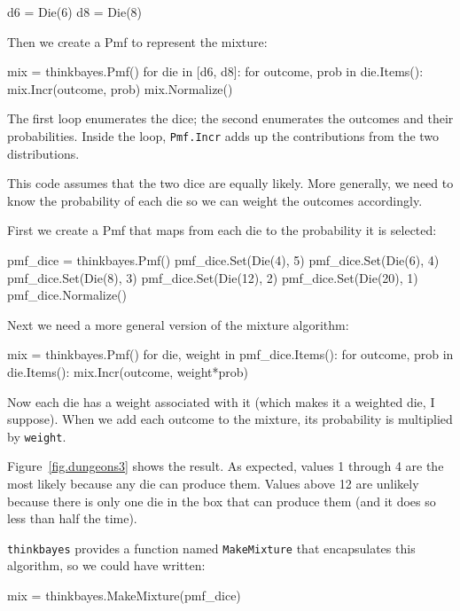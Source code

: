 \documentclass[12pt]{book}
\theoremstyle{exercise}
\begin{document}
\begin{code}
    d6 = Die(6)
    d8 = Die(8)
\end{code}

Then we create a Pmf to represent the mixture:

\begin{code}
    mix = thinkbayes.Pmf()
    for die in [d6, d8]:
        for outcome, prob in die.Items():
            mix.Incr(outcome, prob)
    mix.Normalize()
\end{code}

The first loop enumerates the dice; the second enumerates the
outcomes and their probabilities.  Inside the loop,
{\tt Pmf.Incr} adds up the contributions from the two distributions.

This code assumes that the two dice are equally likely.  More
generally, we need to know the probability of each die so we can
weight the outcomes accordingly.

First we create a Pmf that maps from each die to the probability it is
selected:

\begin{code}
    pmf_dice = thinkbayes.Pmf()
    pmf_dice.Set(Die(4), 5)
    pmf_dice.Set(Die(6), 4)
    pmf_dice.Set(Die(8), 3)
    pmf_dice.Set(Die(12), 2)
    pmf_dice.Set(Die(20), 1)
    pmf_dice.Normalize()
\end{code}

Next we need a more general version of the mixture algorithm:

\begin{code}
    mix = thinkbayes.Pmf()
    for die, weight in pmf_dice.Items():
        for outcome, prob in die.Items():
            mix.Incr(outcome, weight*prob)
\end{code}

Now each die has a weight associated with it (which makes it a
weighted die, I suppose).  When we add each outcome to the mixture,
its probability is multiplied by {\tt weight}.

Figure~\ref{fig.dungeons3} shows the result.  As expected, values 1
through 4 are the most likely because any die can produce them.
Values above 12 are unlikely because there is only one die in the box
that can produce them (and it does so less than half the time).

{\tt thinkbayes} provides a function named {\tt MakeMixture}
that encapsulates this algorithm, so we could have written:

\begin{code}
    mix = thinkbayes.MakeMixture(pmf_dice)
\end{code}
\end{document}
